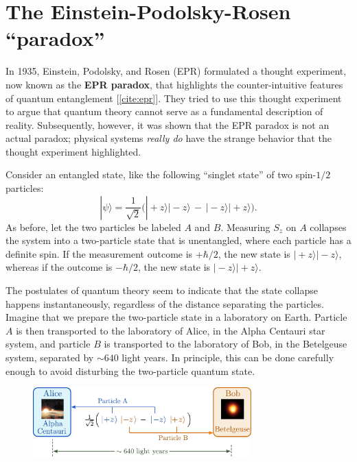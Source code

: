 \documentclass[pra,12pt]{revtex4}
\begin{document}
\section{The Einstein-Podolsky-Rosen ``paradox''}

In 1935, Einstein, Podolsky, and Rosen (EPR) formulated a thought
experiment, now known as the \textbf{EPR paradox}, that highlights the
counter-intuitive features of quantum entanglement [\ref{cite:epr}].
They tried to use this thought experiment to argue that quantum theory
cannot serve as a fundamental description of reality.  Subsequently,
however, it was shown that the EPR paradox is not an actual paradox;
physical systems \textit{really do} have the strange behavior that the
thought experiment highlighted.

Consider an entangled state, like the following ``singlet state'' of
two spin-$1/2$ particles:
\begin{equation}
  |\psi\rangle = \frac{1}{\sqrt{2}} \Big(|\!+\!z\rangle|\!-\!z\rangle \,-\, |\!-\!z\rangle|\!+\!z\rangle\Big).
\end{equation}
As before, let the two particles be labeled $A$ and $B$.  Measuring
$S_z$ on $A$ collapses the system into a two-particle state that is
unentangled, where each particle has a definite spin.  If the
measurement outcome is $+\hbar/2$, the new state is $|\!+\!z\rangle
|\!-\!z\rangle$, whereas if the outcome is $-\hbar/2$, the new state
is $|\!-\!z\rangle|\!+\!z\rangle$.

The postulates of quantum theory seem to indicate that the state
collapse happens instantaneously, regardless of the distance
separating the particles.  Imagine that we prepare the two-particle
state in a laboratory on Earth.  Particle $A$ is then transported to
the laboratory of Alice, in the Alpha Centauri star system, and
particle $B$ is transported to the laboratory of Bob, in the
Betelgeuse system, separated by $\sim 640$ light years.  In principle,
this can be done carefully enough to avoid disturbing the two-particle
quantum state.

\begin{figure}[h]
  \centering\includegraphics[width=0.75\textwidth]{epr}
\end{figure}
\end{document}
